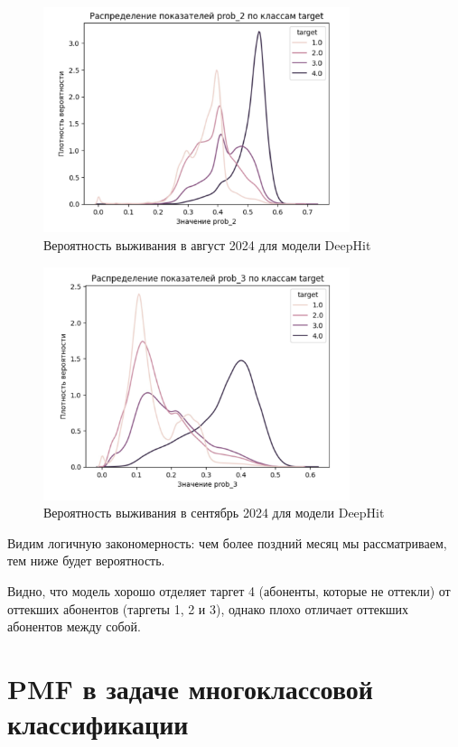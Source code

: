 \documentclass[a4paper,14pt,oneside,openany]{memoir}
\begin{document}
\begin{figure}[H]
	\includegraphics[width=0.8\textwidth]{../figures/prob_2_deephit.png}
	\caption{Вероятность выживания в август 2024 для модели DeepHit}
\end{figure}

\begin{figure}[H]
	\includegraphics[width=0.8\textwidth]{../figures/prob_3_deephit.png}
	\caption{Вероятность выживания в сентябрь 2024 для модели DeepHit}
\end{figure}

Видим логичную закономерность: чем более поздний месяц мы рассматриваем, тем ниже будет вероятность. 

Видно, что модель хорошо отделяет таргет 4 (абоненты, которые не оттекли) от оттекших абонентов (таргеты 1, 2 и 3), однако плохо отличает оттекших абонентов между собой. 

\section{PMF в задаче многоклассовой классификации}
\end{document}
